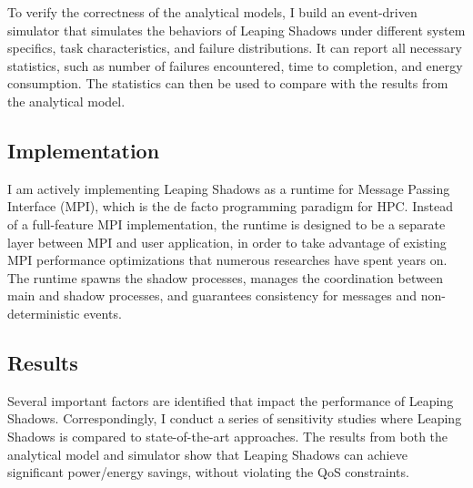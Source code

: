 To verify the correctness of the analytical models, I build an event-driven simulator that simulates the behaviors of Leaping Shadows under different system specifics, task characteristics, and failure distributions. It can report all necessary statistics, such as number of failures encountered, time to completion, and energy consumption. The statistics can then be used to compare with the results from the analytical model.

\subsection{Implementation}
\vspace*{-2mm}
I am actively implementing Leaping Shadows as a runtime for Message Passing Interface (MPI), which is the de facto programming paradigm for HPC. 
Instead of a full-feature MPI implementation, the runtime is designed to be a separate layer between MPI and user application, in order to take advantage of existing MPI performance optimizations that numerous researches have spent years on. 
The runtime spawns the shadow processes, manages the coordination between main and shadow processes, and guarantees consistency for messages and non-deterministic events. 

\subsection{Results}
\vspace*{-2mm}
Several important factors are identified that impact the performance of Leaping Shadows. Correspondingly, I conduct a series of sensitivity studies where Leaping Shadows is compared to state-of-the-art approaches. %
The results from both the analytical model and simulator show that Leaping Shadows can achieve significant power/energy savings, without violating the QoS constraints. %




